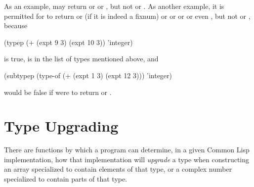 \begin{defun}[Function]
As an example, 
may return  or  or ,
but not  or .
As another example, it is permitted for
 to return
 or  (if it is indeed a fixnum) or
 or  or 
or even , but not  or , because
\begin{lisp}
(typep (+ (expt 9 3) (expt 10 3)) 'integer)
\end{lisp}
is true,  is in the list of types mentioned above, and
\begin{lisp}
(subtypep (type-of (+ (expt 1 3) (expt 12 3))) 'integer)
\end{lisp}
would be false if  were to return  or .
\end{defun}

\section{Type Upgrading}

There are functions by which a program
can determine, in a given Common Lisp implementation, how that
implementation will \emph{upgrade} a type when constructing an array
specialized to contain elements of that type,
or a complex number specialized to contain parts of that type.


